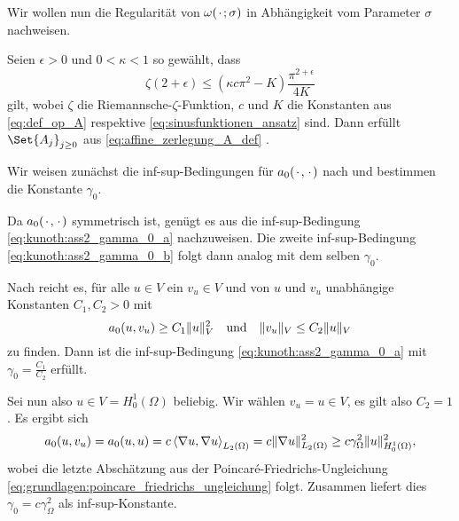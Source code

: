 Wir wollen nun die Regularität von $\omega({\mkern2mu\cdot\mkern2mu}; \sigma)$ in Abhängigkeit vom Parameter $\sigma$ nachweisen.

\begin{Satz}
\label{satz:regularitaet_nachrechnen}
    Seien $\epsilon > 0$ und $0 < \kappa < 1$ so gewählt, dass
    \begin{equation}
        \zeta(2 + \epsilon) \leq (\kappa c \pi^{2} - K) \frac{\pi^{2+\epsilon}}{4K}
    \end{equation}
    gilt,
    wobei $\zeta$ die Riemannsche-$\zeta$-Funktion, $c$ und $K$ die Konstanten aus \eqref{eq:def_op_A} respektive \eqref{eq:sinusfunktionen_ansatz} sind.
    Dann erfüllt $\Set{ A_{j} }_{j \geq 0}$ aus \eqref{eq:affine_zerlegung_A_def} .

    \begin{Beweis}
        Wir weisen zunächst die inf-sup-Bedingungen für $a_{0}({\mkern2mu\cdot\mkern2mu}, {\mkern2mu\cdot\mkern2mu})$ nach und bestimmen die Konstante $\gamma_{0}$.

        Da $a_{0}({\mkern2mu\cdot\mkern2mu}, {\mkern2mu\cdot\mkern2mu})$ symmetrisch ist, genügt es aus die inf-sup-Bedingung \eqref{eq:kunoth:ass2_gamma_0_a} nachzuweisen. Die zweite inf-sup-Bedingung \eqref{eq:kunoth:ass2_gamma_0_b} folgt dann analog mit dem selben $\gamma_{0}$.

        Nach  reicht es, für alle $u \in V$ ein $v_{u} \in V$ und von $u$ und $v_{u}$ unabhängige Konstanten $C_{1}, C_{2} > 0$ mit
        \begin{equation}
            a_{0}(u, v_{u}) \geq C_{1} \lVert u\rVert_{V}^{2} \quad \text{und} \quad \lVert v_{u}\rVert_{V} \leq C_{2} \lVert u\rVert_{V}
        \end{equation}
        zu finden.
        Dann ist die inf-sup-Bedingung \eqref{eq:kunoth:ass2_gamma_0_a} mit $\gamma_{0} = \frac{C_{1}}{C_{2}}$ erfüllt.

        Sei nun also $u \in V = H^{1}_{0}(\Omega)$ beliebig.
        Wir wählen $v_{u} = u \in V$, es gilt also $C_{2} = 1$.
        Es ergibt sich
        \begin{align}
            a_{0}(u, v_{u}) = a_{0}(u, u) = c \left\langle\nabla u,\nabla u\right\rangle_{L_{2}(\Omega)} = c \lVert\nabla u\rVert_{L_{2}(\Omega)}^{2} \geq c \gamma_{\Omega}^{2} \lVert u\rVert_{H^{1}_{0}(\Omega)}^{2},
        \end{align}
        wobei die letzte Abschätzung aus der Poincaré-Friedrichs-Ungleichung \eqref{eq:grundlagen:poincare_friedrichs_ungleichung} folgt.
        Zusammen liefert dies $\gamma_{0} = c \gamma_{\Omega}^{2}$ als inf-sup-Konstante.


\end{Beweis}
\end{Satz}
